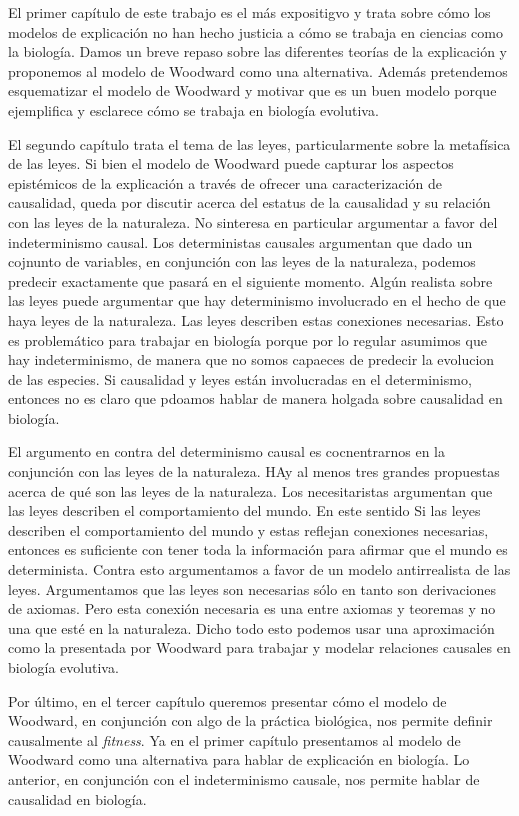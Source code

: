 El primer capítulo de este trabajo es el más expositigvo y trata sobre cómo los modelos de explicación no han hecho justicia a cómo se trabaja en ciencias como la biología. Damos un breve repaso sobre las diferentes teorías de la explicación y proponemos al modelo de Woodward como una alternativa. Además pretendemos esquematizar el modelo de Woodward y motivar que es un buen modelo porque ejemplifica y esclarece cómo se trabaja en biología evolutiva.

El segundo capítulo trata el tema de las leyes, particularmente sobre la metafísica de las leyes. Si bien el modelo de Woodward puede capturar los aspectos epistémicos de la explicación a través de ofrecer una caracterización de causalidad, queda por discutir acerca del estatus de la causalidad y su relación con las leyes de la naturaleza. No sinteresa en particular argumentar a favor del indeterminismo causal. Los deterministas causales argumentan que dado un cojnunto de variables, en conjunción con las leyes de la naturaleza, podemos predecir exactamente que pasará en el siguiente momento. Algún realista sobre las leyes puede argumentar que hay determinismo involucrado en el hecho de que haya leyes de la naturaleza. Las leyes describen estas conexiones necesarias. Esto es problemático para trabajar en biología porque por lo regular asumimos que hay indeterminismo, de manera que no somos capaeces de predecir la evolucion de las especies. Si causalidad y leyes están involucradas en el determinismo, entonces no es claro que pdoamos hablar de manera holgada sobre causalidad en biología.

El argumento en contra del determinismo causal es cocnentrarnos en la conjunción con las leyes de la naturaleza. HAy al menos tres grandes propuestas acerca de qué son las leyes de la naturaleza. Los necesitaristas argumentan que las leyes describen el comportamiento del mundo. En este sentido Si las leyes describen el comportamiento del mundo y estas reflejan conexiones necesarias, entonces es suficiente con tener toda la información para afirmar que el mundo es determinista. Contra esto argumentamos a favor de un modelo antirrealista de las leyes. Argumentamos que las leyes son necesarias sólo en tanto son derivaciones de axiomas. Pero esta conexión necesaria es una entre axiomas y teoremas y no una que esté en la naturaleza. Dicho todo esto podemos usar una aproximación como la presentada por Woodward para trabajar y modelar relaciones causales en biología evolutiva.

Por último, en el tercer capítulo queremos presentar cómo el modelo de Woodward, en conjunción con algo de la práctica biológica, nos permite definir causalmente al \emph{fitness}. Ya en el primer capítulo presentamos al modelo de Woodward como una alternativa para hablar de explicación en biología. Lo anterior, en conjunción con el indeterminismo causale, nos permite hablar de causalidad en biología.

